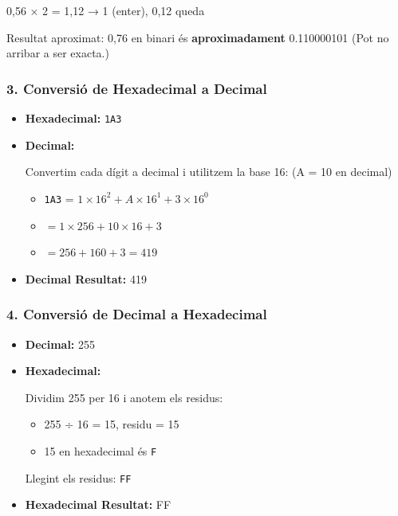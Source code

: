 \documentclass[
  12 pt,
  a4paper,
]{article}
\providecommand{\tightlist}{%
  \setlength{\itemsep}{0pt}\setlength{\parskip}{0pt}}
\begin{document}
0,56 × 2 = 1,12 → 1 (enter), 0,12 queda

Resultat aproximat: 0,76 en binari és \textbf{aproximadament}
0.110000101 (Pot no arribar a ser exacta.)

\subsubsection{3. Conversió de Hexadecimal a
Decimal}\label{conversiuxf3-de-hexadecimal-a-decimal}

\begin{itemize}
\item
  \textbf{Hexadecimal:} \texttt{1A3}
\item
  \textbf{Decimal:}

  Convertim cada dígit a decimal i utilitzem la base 16: (A = 10 en
  decimal)

  \begin{itemize}
  \tightlist
  \item
    \texttt{1A3} = \(1 \times 16^2 + A \times 16^1 + 3 \times 16^0\)
  \item
    \(= 1 \times 256 + 10 \times 16 + 3\)
  \item
    \(= 256 + 160 + 3 = 419\)
  \end{itemize}
\item
  \textbf{Decimal Resultat:} 419
\end{itemize}

\subsubsection{4. Conversió de Decimal a
Hexadecimal}\label{conversiuxf3-de-decimal-a-hexadecimal}

\begin{itemize}
\item
  \textbf{Decimal:} 255
\item
  \textbf{Hexadecimal:}

  Dividim 255 per 16 i anotem els residus:

  \begin{itemize}
  \tightlist
  \item
    255 ÷ 16 = 15, residu = 15
  \item
    15 en hexadecimal és \texttt{F}
  \end{itemize}

  Llegint els residus: \texttt{FF}
\item
  \textbf{Hexadecimal Resultat:} FF
\end{itemize}
\end{document}
